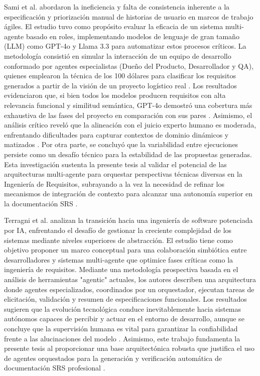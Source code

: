 Sami et al. \cite{Sami2026} abordaron la ineficiencia y falta de consistencia inherente a la especificación y priorización manual de historias de
usuario en marcos de trabajo ágiles. El estudio tuvo como propósito evaluar la eficacia de un sistema multi-agente basado en roles, implementando 
modelos de lenguaje de gran tamaño (LLM) como GPT-4o y Llama 3.3 para automatizar estos procesos críticos. La metodología consistió en simular la 
interacción de un equipo de desarrollo conformado por agentes especialistas (Dueño del Producto, Desarrollador y QA), quienes emplearon la técnica 
de los 100 dólares para clasificar los requisitos generados a partir de la visión de un proyecto logístico real \cite{Sami2026}. Los resultados 
evidenciaron que, si bien todos los modelos producen requisitos con alta relevancia funcional y similitud semántica, GPT-4o demostró una cobertura 
más exhaustiva de las fases del proyecto en comparación con sus pares \cite{Sami2026}. Asimismo, el análisis crítico reveló que la alineación con el 
juicio experto humano es moderada, enfrentando dificultades para capturar contextos de dominio dinámicos y matizados \cite{Sami2026}. Por otra parte, 
se concluyó que la variabilidad entre ejecuciones persiste como un desafío técnico para la estabilidad de las propuestas generadas. Esta investigación 
sustenta la presente tesis al validar el potencial de las arquitecturas multi-agente para orquestar perspectivas técnicas diversas en la Ingeniería de 
Requisitos, subrayando a la vez la necesidad de refinar los mecanismos de integración de contexto para alcanzar una autonomía superior en la documentación 
SRS \cite{Sami2026}.


Terragni et al. \cite{Terragni2025} analizan la transición hacia una ingeniería de software potenciada por IA, enfrentando el desafío de gestionar 
la creciente complejidad de los sistemas mediante niveles superiores de abstracción. El estudio tiene como objetivo proponer un marco conceptual para 
una colaboración simbiótica entre desarrolladores y sistemas multi-agente que optimice fases críticas como la ingeniería de requisitos. Mediante una 
metodología prospectiva basada en el análisis de herramientas "agentic" actuales, los autores describen una arquitectura donde agentes especializados, 
coordinados por un orquestador, ejecutan tareas de elicitación, validación y resumen de especificaciones funcionales. Los resultados sugieren que la 
evolución tecnológica conduce inevitablemente hacia sistemas autónomos capaces de percibir y actuar en el entorno de desarrollo, aunque se concluye 
que la supervisión humana es vital para garantizar la confiabilidad frente a las alucinaciones del modelo \cite{Terragni2025}. Asimismo, este trabajo 
fundamenta la presente tesis al proporcionar una base arquitectónica robusta que justifica el uso de agentes orquestados para la generación y 
verificación automática de documentación SRS profesional \cite{Terragni2025}.

